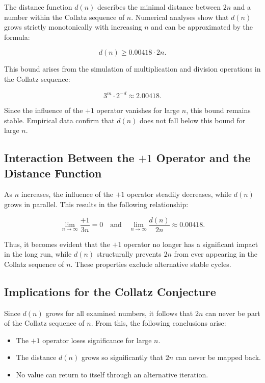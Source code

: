 \documentclass[a4paper,12pt]{article}
\begin{document}
The distance function \( d(n) \) describes the minimal distance between \( 2n \) and a number within the Collatz sequence of \( n \). Numerical analyses show that \( d(n) \) grows strictly monotonically with increasing \( n \) and can be approximated by the formula:

\begin{equation} 
    d(n) \geq 0.00418 \cdot 2n.
\end{equation}

This bound arises from the simulation of multiplication and division operations in the Collatz sequence:

\begin{equation}
    3^m \cdot 2^{-d} \approx 2.00418.
\end{equation}

Since the influence of the \( +1 \) operator vanishes for large \( n \), this bound remains stable. Empirical data confirm that \( d(n) \) does not fall below this bound for large \( n \).

\subsection{Interaction Between the \( +1 \) Operator and the Distance Function}

As \( n \) increases, the influence of the \( +1 \) operator steadily decreases, while \( d(n) \) grows in parallel. This results in the following relationship:

\begin{equation} 
    \lim_{n \to \infty} \frac{+1}{3n} = 0 \quad \text{and} \quad \lim_{n \to \infty} \frac{d(n)}{2n} \approx 0.00418.
\end{equation}

Thus, it becomes evident that the \( +1 \) operator no longer has a significant impact in the long run, while \( d(n) \) structurally prevents \( 2n \) from ever appearing in the Collatz sequence of \( n \). These properties exclude alternative stable cycles.

\subsection{Implications for the Collatz Conjecture}

Since \( d(n) \) grows for all examined numbers, it follows that \( 2n \) can never be part of the Collatz sequence of \( n \). From this, the following conclusions arise:

\begin{itemize}
    \item The \( +1 \) operator loses significance for large \( n \).
    \item The distance \( d(n) \) grows so significantly that \( 2n \) can never be mapped back.
    \item No value can return to itself through an alternative iteration.
\end{itemize}
\end{document}
